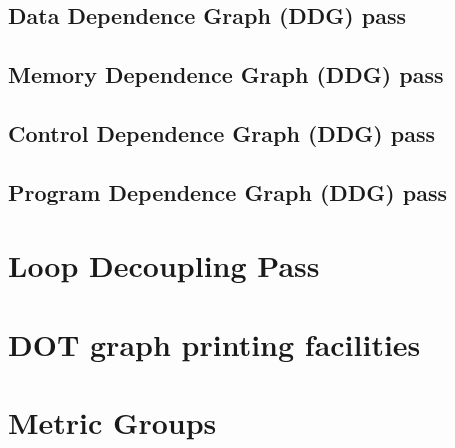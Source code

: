 \subsection{Data Dependence Graph (DDG) pass}

\subsection{Memory Dependence Graph (DDG) pass}

\subsection{Control Dependence Graph (DDG) pass}

\subsection{Program Dependence Graph (DDG) pass}

\section{Loop Decoupling Pass} 

\section{DOT graph printing facilities} 

\section{Metric Groups}
